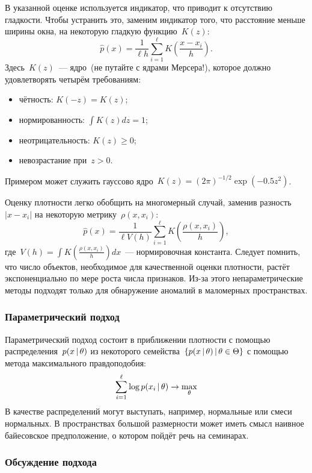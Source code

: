 \documentclass[12pt,fleqn]{article}
\begin{document}
В указанной оценке используется индикатор, что приводит к отсутствию гладкости.
Чтобы устранить это, заменим индикатор того, что расстояние меньше ширины окна,
на некоторую гладкую функцию~$K(z)$:
\[
    \hat p(x)
    =
    \frac{1}{\ell h}
    \sum_{i = 1}^{\ell}
        K
        \left(
            \frac{x - x_i}{h}
        \right).
\]
Здесь~$K(z)$~--- ядро~(не путайте с ядрами Мерсера!), которое должно удовлетворять
четырём требованиям:
\begin{itemize}
    \item чётность: $K(-z) = K(z)$;
    \item нормированность: $\int K(z) dz = 1$;
    \item неотрицательность: $K(z) \geq 0$;
    \item невозрастание при~$z > 0$.
\end{itemize}
Примером может служить гауссово ядро~$K(z) = (2 \pi)^{-1/2} \exp(-0.5 z^2)$.

Оценку плотности легко обобщить на многомерный случай, заменив разность~$|x - x_i|$
на некоторую метрику~$\rho(x, x_i)$:
\begin{equation}
\label{eq:nonparametric}
    \hat p(x)
    =
    \frac{1}{\ell V(h)}
    \sum_{i = 1}^{\ell}
        K
        \left(
            \frac{\rho(x, x_i)}{h}
        \right),
\end{equation}
где~$V(h) = \int K \left( \frac{\rho(x, x_i)}{h} \right) dx$~--- нормировочная константа.
Следует помнить, что число объектов, необходимое для качественной оценки плотности,
растёт экспоненциально по мере роста числа признаков.
Из-за этого непараметрические методы подходят только для обнаружение аномалий
в маломерных пространствах.

\subsubsection{Параметрический подход}

Параметрический подход состоит в приближении плотности с помощью распределения~$p(x \mspace{3mu}{|}\mspace{3mu} \theta)$
из некоторого семейства~$\{p(x \mspace{3mu}{|}\mspace{3mu} \theta) \mspace{3mu}{|}\mspace{3mu} \theta \in \Theta\}$
с помощью метода максимального правдоподобия:
\[
    \sum_{i = 1}^{\ell}
        \log p(x_i \mspace{3mu}{|}\mspace{3mu} \theta)
    \to
    \max_\theta
\]
В качестве распределений могут выступать, например, нормальные или смеси нормальных.
В пространствах большой размерности может иметь смысл наивное байесовское предположение,
о котором пойдёт речь на семинарах.

\subsubsection{Обсуждение подхода}
\end{document}

